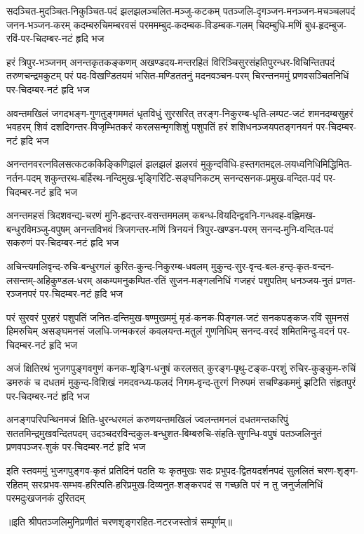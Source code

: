 \setlength{\shlokaspaceskip}{4pt}
\fourlineindentedshloka
{सदञ्चित-मुदञ्चित-निकुञ्चित-पदं झलझलञ्चलित-मञ्जु-कटकम्}
{पतञ्जलि-दृगञ्जन-मनञ्जन-मचञ्चलपदं जनन-भञ्जन-करम्}
{कदम्बरुचिमम्बरवसं परममम्बुद-कदम्बक-विडम्बक-गलम्}
{चिदम्बुधि-मणिं बुध-हृदम्बुज-रविं-पर-चिदम्बर-नटं हृदि भज} %

\fourlineindentedshloka
{हरं त्रिपुर-भञ्जनम् अनन्तकृतकङ्कणम् अखण्डदय-मन्तरहितं}
{विरिञ्चिसुरसंहतिपुरन्धर-विचिन्तितपदं तरुणचन्द्रमकुटम्}
{परं पद-विखण्डितयमं भसित-मण्डिततनुं मदनवञ्चन-परम्}
{चिरन्तनममुं प्रणवसञ्चितनिधिं पर-चिदम्बर-नटं हृदि भज} %

\fourlineindentedshloka
{अवन्तमखिलं जगदभङ्ग-गुणतुङ्गममतं धृतविधुं सुरसरित्}
{तरङ्ग-निकुरम्ब-धृति-लम्पट-जटं शमनदम्बसुहरं भवहरम्}
{शिवं दशदिगन्तर-विजृम्भितकरं करलसन्मृगशिशुं पशुपतिं}
{हरं शशिधनञ्जयपतङ्गनयनं पर-चिदम्बर-नटं हृदि भज} %

\fourlineindentedshloka
{अनन्तनवरत्नविलसत्कटककिङ्किणिझलं झलझलं झलरवं}
{मुकुन्दविधि-हस्तगतमद्दल-लयध्वनिधिमिद्धिमित-नर्तन-पदम्}
{शकुन्तरथ-बर्हिरथ-नन्दिमुख-भृङ्गिरिटि-सङ्घनिकटम्}
{सनन्दसनक-प्रमुख-वन्दित-पदं पर-चिदम्बर-नटं हृदि भज} %

\fourlineindentedshloka
{अनन्तमहसं त्रिदशवन्द्य-चरणं मुनि-हृदन्तर-वसन्तममलम्}
{कबन्ध-वियदिन्द्ववनि-गन्धवह-वह्निमख-बन्धुरविमञ्जु-वपुषम्}
{अनन्तविभवं त्रिजगन्तर-मणिं त्रिनयनं त्रिपुर-खण्डन-परम्}
{सनन्द-मुनि-वन्दित-पदं सकरुणं पर-चिदम्बर-नटं हृदि भज} %

\fourlineindentedshloka
{अचिन्त्यमलिवृन्द-रुचि-बन्धुरगलं कुरित-कुन्द-निकुरम्ब-धवलम्}
{मुकुन्द-सुर-वृन्द-बल-हन्तृ-कृत-वन्दन-लसन्तम्-अहिकुण्डल-धरम्}
{अकम्पमनुकम्पित-रतिं सुजन-मङ्गलनिधिं गजहरं पशुपतिम्}
{धनञ्जय-नुतं प्रणत-रञ्जनपरं पर-चिदम्बर-नटं हृदि भज} %

\fourlineindentedshloka
{परं सुरवरं पुरहरं पशुपतिं जनित-दन्तिमुख-षण्मुखममुं}
{मृडं-कनक-पिङ्गल-जटं सनकपङ्कज-रविं सुमनसं हिमरुचिम्}
{असङ्घमनसं जलधि-जन्मकरलं कवलयन्त-मतुलं गुणनिधिम्}
{सनन्द-वरदं शमितमिन्दु-वदनं पर-चिदम्बर-नटं हृदि भज} %

\fourlineindentedshloka
{अजं क्षितिरथं भुजगपुङ्गवगुणं कनक-शृङ्गि-धनुषं करलसत्}
{कुरङ्ग-पृथु-टङ्क-परशुं रुचिर-कुङ्कुम-रुचिं डमरुकं च दधतमं}
{मुकुन्द-विशिखं नमदवन्ध्य-फलदं निगम-वृन्द-तुरगं निरुपमं}
{सचण्डिकममुं झटिति संहृतपुरं पर-चिदम्बर-नटं हृदि भज} %

\fourlineindentedshloka
{अनङ्गपरिपन्थिनमजं क्षिति-धुरन्धरमलं करुणयन्तमखिलं}
{ज्वलन्तमनलं दधतमन्तकरिपुं सततमिन्द्रमुखवन्दितपदम्}
{उदञ्चदरविन्दकुल-बन्धुशत-बिम्बरुचि-संहति-सुगन्धि-वपुषं}
{पतञ्जलिनुतं प्रणवपञ्जर-शुकं पर-चिदम्बर-नटं हृदि भज} %

\fourlineindentedshloka
{इति स्तवममुं भुजगपुङ्गव-कृतं प्रतिदिनं पठति यः कृतमुखः}
{सदः प्रभुपद-द्वितयदर्शनपदं सुललितं चरण-शृङ्ग-रहितम्}
{सरःप्रभव-सम्भव-हरित्पति-हरिप्रमुख-दिव्यनुत-शङ्करपदं}
{स गच्छति परं न तु जनुर्जलनिधिं परमदुःखजनकं दुरितदम्} %

॥इति श्रीपतञ्जलिमुनिप्रणीतं चरणशृङ्गरहित-नटरजस्तोत्रं सम्पूर्णम्॥
\setlength{\shlokaspaceskip}{24pt}